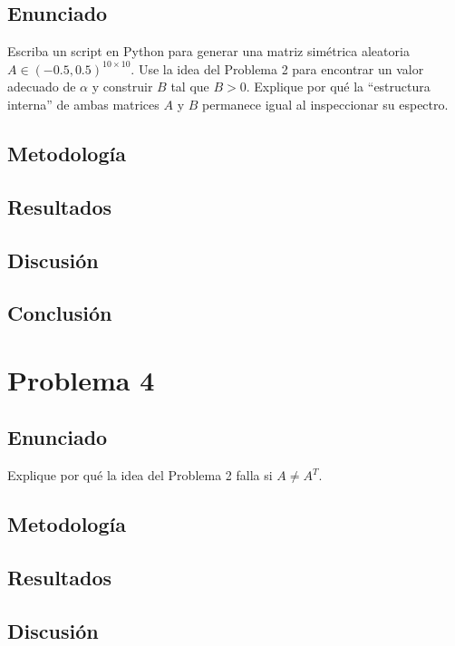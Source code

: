 \documentclass{article}
\begin{document}
\subsection{Enunciado}
Escriba un script en Python para generar una matriz simétrica aleatoria $A \in (-0.5, 0.5)^{10 \times 10}$. Use la idea del Problema 2 para encontrar un valor adecuado de $\alpha$ y construir $B$ tal que $B > 0$. Explique por qué la ``estructura interna'' de ambas matrices $A$ y $B$ permanece igual al inspeccionar su espectro.

\subsection{Metodología}

\subsection{Resultados}
\setcounter{equation}{0}

\subsection{Discusión}

\subsection{Conclusión}

\section{Problema 4}

\subsection{Enunciado}
Explique por qué la idea del Problema 2 falla si $A \neq A^T$.

\subsection{Metodología}

\subsection{Resultados}
\setcounter{equation}{0}

\subsection{Discusión}
\end{document}
